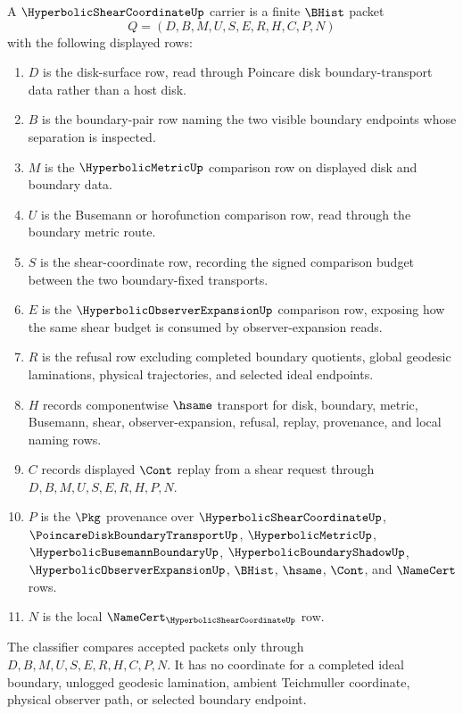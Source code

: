 \begin{definition}
\label{def:hyperbolic-shear-coordinate-carrier}
A $\HyperbolicShearCoordinateUp$ carrier is a finite $\BHist$ packet
$$
Q=(D,B,M,U,S,E,R,H,C,P,N)
$$
with the following displayed rows:
\begin{enumerate}
\item $D$ is the disk-surface row, read through Poincare disk boundary-transport data rather than a host disk.
\item $B$ is the boundary-pair row naming the two visible boundary endpoints whose separation is inspected.
\item $M$ is the $\HyperbolicMetricUp$ comparison row on displayed disk and boundary data.
\item $U$ is the Busemann or horofunction comparison row, read through the boundary metric route.
\item $S$ is the shear-coordinate row, recording the signed comparison budget between the two boundary-fixed transports.
\item $E$ is the $\HyperbolicObserverExpansionUp$ comparison row, exposing how the same shear budget is consumed by observer-expansion reads.
\item $R$ is the refusal row excluding completed boundary quotients, global geodesic laminations, physical trajectories, and selected ideal endpoints.
\item $H$ records componentwise $\hsame$ transport for disk, boundary, metric, Busemann, shear, observer-expansion, refusal, replay, provenance, and local naming rows.
\item $C$ records displayed $\Cont$ replay from a shear request through $D,B,M,U,S,E,R,H,P,N$.
\item $P$ is the $\Pkg$ provenance over $\HyperbolicShearCoordinateUp$, $\PoincareDiskBoundaryTransportUp$, $\HyperbolicMetricUp$, $\HyperbolicBusemannBoundaryUp$, $\HyperbolicBoundaryShadowUp$, $\HyperbolicObserverExpansionUp$, $\BHist$, $\hsame$, $\Cont$, and $\NameCert$ rows.
\item $N$ is the local $\NameCert_{\HyperbolicShearCoordinateUp}$ row.
\end{enumerate}
The classifier compares accepted packets only through $D,B,M,U,S,E,R,H,C,P,N$. It has no coordinate for a completed ideal boundary, unlogged geodesic lamination, ambient Teichmuller coordinate, physical observer path, or selected boundary endpoint.
\end{definition}

